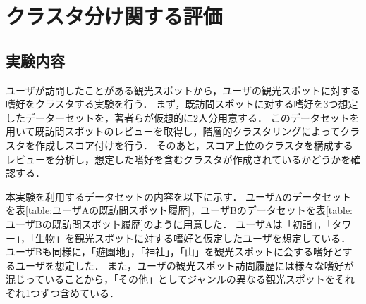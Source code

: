 \documentclass{deimj}
\begin{document}
\section{クラスタ分け関する評価}
\subsection{実験内容}
ユーザが訪問したことがある観光スポットから，ユーザの観光スポットに対する嗜好をクラスタする実験を行う．
まず，既訪問スポットに対する嗜好を3つ想定したデーターセットを，著者らが仮想的に2人分用意する．
このデータセットを用いて既訪問スポットのレビューを取得し，階層的クラスタリングによってクラスタを作成しスコア付けを行う．
そのあと，スコア上位のクラスタを構成するレビューを分析し，想定した嗜好を含むクラスタが作成されているかどうかを確認する．


本実験を利用するデータセットの内容を以下に示す．
ユーザAのデータセットを表\ref{table:ユーザAの既訪問スポット履歴}，ユーザBのデータセットを表\ref{table:ユーザBの既訪問スポット履歴}のように用意した．
ユーザAは「初詣」，「タワー」，「生物」を観光スポットに対する嗜好と仮定したユーザを想定している．
ユーザBも同様に，「遊園地」，「神社」，「山」を観光スポットに会する嗜好とするユーザを想定した．
また，ユーザの観光スポット訪問履歴には様々な嗜好が混じっていることから，「その他」としてジャンルの異なる観光スポットをそれぞれ1つずつ含めている．
\end{document}

